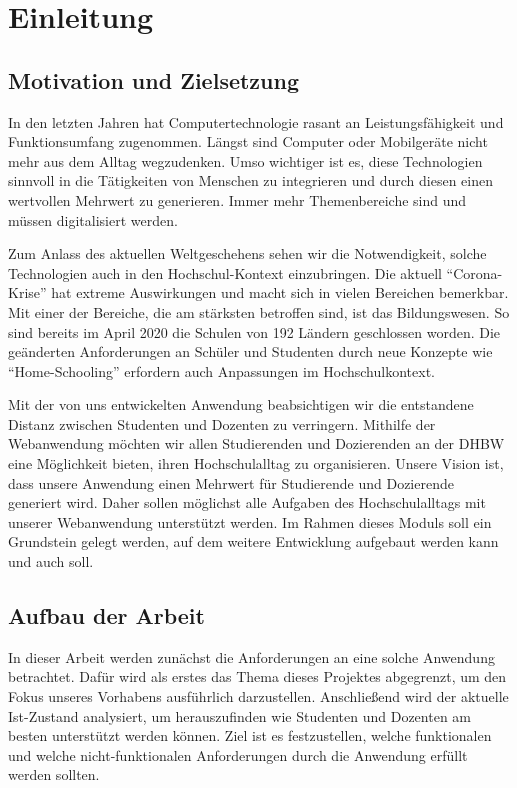 \chapter{Einleitung}
\section{Motivation und Zielsetzung}
In den letzten Jahren hat Computertechnologie rasant an Leistungsfähigkeit und Funktionsumfang zugenommen.
Längst sind Computer oder Mobilgeräte nicht mehr aus dem Alltag wegzudenken.
Umso wichtiger ist es, diese Technologien sinnvoll in die Tätigkeiten von Menschen zu integrieren und durch diesen einen wertvollen Mehrwert zu generieren.
Immer mehr Themenbereiche sind und müssen digitalisiert werden.

Zum Anlass des aktuellen Weltgeschehens sehen wir die Notwendigkeit, solche Technologien auch in den Hochschul-Kontext einzubringen.
Die aktuell \enquote{Corona-Krise} hat extreme Auswirkungen und macht sich in vielen Bereichen bemerkbar.
Mit einer der Bereiche, die am stärksten betroffen sind, ist das Bildungswesen.
So sind bereits im April 2020 die Schulen von 192 Ländern geschlossen worden.\autocite[S. 845]{Donohue2020}
Die geänderten Anforderungen an Schüler und Studenten durch neue Konzepte wie \enquote{Home-Schooling} erfordern auch Anpassungen im Hochschulkontext.

Mit der von uns entwickelten Anwendung beabsichtigen wir die entstandene Distanz zwischen Studenten und Dozenten zu verringern. 
Mithilfe der Webanwendung möchten wir allen Studierenden und Dozierenden an der DHBW eine Möglichkeit bieten, ihren Hochschulalltag zu organisieren. 
Unsere Vision ist, dass unsere Anwendung einen Mehrwert für Studierende und Dozierende generiert wird.
Daher sollen möglichst alle Aufgaben des Hochschulalltags mit unserer Webanwendung unterstützt werden. 
Im Rahmen dieses Moduls soll ein Grundstein gelegt werden, auf dem weitere Entwicklung aufgebaut werden kann und auch soll.

\clearpage
\section{Aufbau der Arbeit} %
In dieser Arbeit werden zunächst die Anforderungen an eine solche Anwendung betrachtet.
Dafür wird als erstes das Thema dieses Projektes abgegrenzt, um den Fokus unseres Vorhabens ausführlich darzustellen.
Anschließend wird der aktuelle Ist-Zustand analysiert, um herauszufinden wie Studenten und Dozenten am besten unterstützt werden können.
Ziel ist es festzustellen, welche funktionalen und welche nicht-funktionalen Anforderungen durch die Anwendung erfüllt werden sollten.

